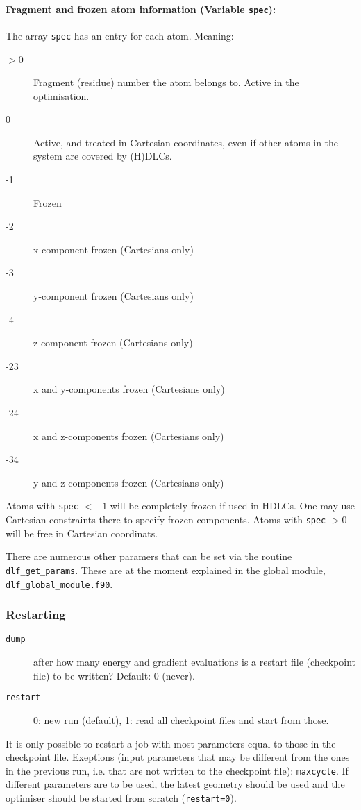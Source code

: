 \documentclass{article}
\begin{document}
\paragraph{Fragment and frozen atom information (Variable \texttt{spec}):}
The array \texttt{spec} has an entry for each atom. Meaning:
\begin{description}
\item[$>$0] Fragment (residue) number the atom belongs to. Active in the
  optimisation.
\item[0]   Active, and treated in Cartesian coordinates, even if other atoms
  in the system are covered by (H)DLCs.
\item[-1]  Frozen 
\item[-2]  x-component frozen (Cartesians only)
\item[-3]  y-component frozen (Cartesians only)
\item[-4]  z-component frozen (Cartesians only)
\item[-23]  x and y-components frozen (Cartesians only)
\item[-24]  x and z-components frozen (Cartesians only)
\item[-34]  y and z-components frozen (Cartesians only)
\end{description}
Atoms with \texttt{spec} $<-1$ will be completely frozen if used in HDLCs. One
may use Cartesian constraints there to specify frozen components. Atoms with
\texttt{spec} $>0$ will be free in Cartesian coordinats.

There are numerous other paramers that can be set via the routine
\texttt{dlf\_get\_params}. These are at the moment explained in the global
module, \texttt{dlf\_global\_module.f90}.

\subsubsection{Restarting}

\begin{description}
\item[\texttt{dump}] after how many energy and gradient evaluations is a
  restart file (checkpoint file) to be written? Default: 0 (never).
\item[\texttt{restart}] 0: new run (default), 1: read all checkpoint files and start
  from those.
\end{description}

It is only possible to restart a job with most parameters equal to those in
the checkpoint file. Exeptions (input parameters that may be different from
the ones in the previous run, i.e. that are not written to the checkpoint
file): \texttt{maxcycle}. If different parameters are to be used, the latest
geometry should be used and the optimiser should be started from scratch
(\texttt{restart=0}).
\end{document}
